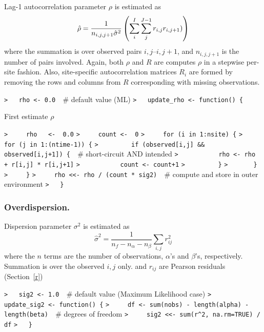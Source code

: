 \documentclass[a4paper]{article}
\begin{document}
Lag-1 autocorrelation parameter $\rho$ is estimated as
\begin{equation}
  \hat{\rho} = \frac{1}{n_{i,j,j+1}\hat{\sigma}^2} \left(\sum_i^I\sum_j^{J-1} r_{i,j}r_{i,j+1}) \right)
\end{equation}
where the summation is over observed pairs $i,j$--$i,j+1$, and $n_{i,j,j+1}$ is the number of pairs involved.
Again, both $\rho$ and $R$ are computes $\rho$ in a stepwise per-site fashion.
Also, site-specific autocorrelation matrices $R_i$ are formed by removing the rows and columns from $R$
corresponding with missing observations.\par
\verb~>   rho <- 0.0  ~{\sffamily\# default value (ML)}\newline
\verb~>   update_rho <- function() {~\par
First estimate $\rho$\par
\verb~>     rho   <-  0.0~\newline
\verb~>     count <-  0~\newline
\verb~>     for (i in 1:nsite) {~\newline
\verb~>       for (j in 1:(ntime-1)) {~\newline
\verb~>         if (observed[i,j] && observed[i,j+1]) {  ~{\sffamily\# short-circuit AND intended}\newline
\verb~>           rho <- rho + r[i,j] * r[i,j+1]~\newline
\verb~>           count <- count+1~\newline
\verb~>         }~\newline
\verb~>       }~\newline
\verb~>     }~\newline
\verb~>     rho <<- rho / (count * sig2)  ~{\sffamily\# compute and store in outer environment}\newline
\verb~>   }~\par



\subsubsection{Overdispersion. \label{sig2}}\par

Dispersion parameter $\sigma^2$ is estimated as
\begin{equation}
  \hat{\sigma}^2 = \frac{1}{n_f - n_\alpha - n_\beta} \sum_{i,j} r_{ij}^2
\end{equation}
where the $n$ terms are the number of observations, $\alpha$'s and $\beta$'s, respectively.
Summation is over the observed $i,j$ only.
and $r_{ij}$ are Pearson residuals (Section~\ref{r})\par
\verb~>   sig2 <- 1.0  ~{\sffamily\# default value (Maximum Likelihood case)}\newline
\verb~>   update_sig2 <- function() {~\newline
\verb~>     df <- sum(nobs) - length(alpha) - length(beta)  ~{\sffamily\# degrees of freedom}\newline
\verb~>     sig2 <<- sum(r^2, na.rm=TRUE) / df~\newline
\verb~>   }~\par
\end{document}
